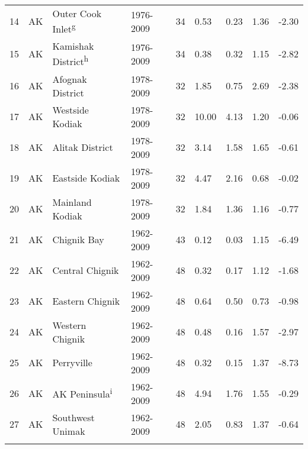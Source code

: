 {\begin{longtable}{lllllllll}
  14 & AK & Outer Cook Inlet\textsuperscript{g} & 1976-2009 &  34 & 0.53 & 0.23 & 1.36 & -2.30 \\ 
  15 & AK & Kamishak District\textsuperscript{h} & 1976-2009 &  34 & 0.38 & 0.32 & 1.15 & -2.82 \\ 
  16 & AK & Afognak District & 1978-2009 &  32 & 1.85 & 0.75 & 2.69 & -2.38 \\ 
  17 & AK & Westside Kodiak & 1978-2009 &  32 & 10.00 & 4.13 & 1.20 & -0.06 \\ 
  18 & AK & Alitak District & 1978-2009 &  32 & 3.14 & 1.58 & 1.65 & -0.61 \\ 
  19 & AK & Eastside Kodiak & 1978-2009 &  32 & 4.47 & 2.16 & 0.68 & -0.02 \\ 
  20 & AK & Mainland Kodiak & 1978-2009 &  32 & 1.84 & 1.36 & 1.16 & -0.77 \\ 
  21 & AK & Chignik Bay & 1962-2009 &  43 & 0.12 & 0.03 & 1.15 & -6.49 \\ 
  22 & AK & Central Chignik & 1962-2009 &  48 & 0.32 & 0.17 & 1.12 & -1.68 \\ 
  23 & AK & Eastern Chignik & 1962-2009 &  48 & 0.64 & 0.50 & 0.73 & -0.98 \\ 
  24 & AK & Western Chignik & 1962-2009 &  48 & 0.48 & 0.16 & 1.57 & -2.97 \\ 
  25 & AK & Perryville & 1962-2009 &  48 & 0.32 & 0.15 & 1.37 & -8.73 \\ 
  26 & AK & AK Peninsula\textsuperscript{i} & 1962-2009 &  48 & 4.94 & 1.76 & 1.55 & -0.29 \\ 
  27 & AK & Southwest Unimak & 1962-2009 &  48 & 2.05 & 0.83 & 1.37 & -0.64 \\ 
  \hline
\label{tab:bloom:1}
\end{longtable}
}
